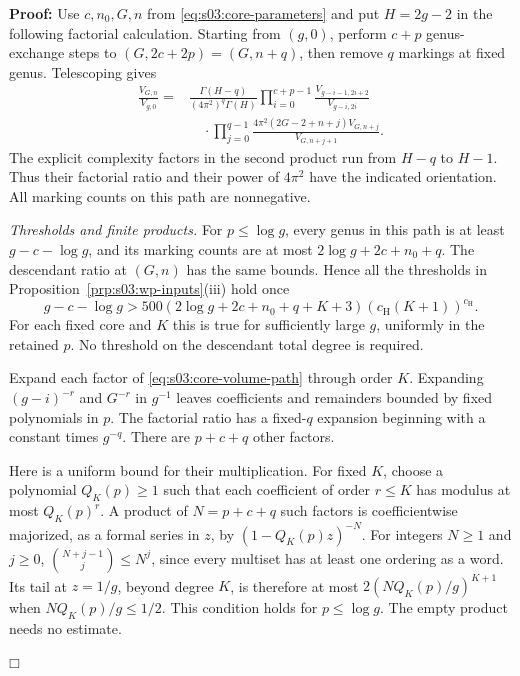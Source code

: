 \documentclass[a4paper,10pt]{article}
\numberwithin{equation}{section}
\theoremstyle{paperplain}
\theoremstyle{paperremark}
\theoremstyle{paperplain}
\newenvironment{prf}{\noindent \textbf{Proof: }}{\hfill $\mdlgwhtsquare$\par\addvspace{0.5\baselineskip}}
\begin{document}
\begin{prf}
Use $c,n_0,G,n$ from \eqref{eq:s03:core-parameters} and put
$H=2g-2$ in the following factorial calculation.
Starting from $(g,0)$, perform $c+p$ genus-exchange steps to
$(G,2c+2p)=(G,n+q)$, then remove $q$ markings at fixed genus.
Telescoping gives
\begin{equation}
\label{eq:s03:core-volume-path}
\begin{split}
\frac{V_{G,n}}{V_{g,0}}
={}&\frac{\Gamma(H-q)}{(4\pi^2)^q\Gamma(H)}
 \prod_{i=0}^{c+p-1}\frac{V_{g-i-1,2i+2}}{V_{g-i,2i}}\\
&\quad\cdot\prod_{j=0}^{q-1}
 \frac{4\pi^2(2G-2+n+j)V_{G,n+j}}{V_{G,n+j+1}}.
\end{split}
\end{equation}
The explicit complexity factors in the second product run from
$H-q$ to $H-1$. Thus their factorial ratio and their power of
$4\pi^2$ have the indicated orientation. All marking counts
on this path are nonnegative.

\smallskip\noindent
\emph{Thresholds and finite products.}
For $p\leq\log g$, every genus in this path is at least
$g-c-\log g$, and its marking counts are at most
$2\log g+2c+n_0+q$. The descendant ratio at $(G,n)$ has the same
bounds. Hence all the thresholds in
Proposition~\ref{prp:s03:wp-inputs}\textup{(iii)} hold once
\[
g-c-\log g>
500(2\log g+2c+n_0+q+K+3)
       (c_{\mathrm H}(K+1))^{c_{\mathrm H}}.
\]
For each fixed core and $K$ this is true for sufficiently large $g$,
uniformly in the retained $p$. No threshold on the descendant
total degree is required.

Expand each factor of \eqref{eq:s03:core-volume-path} through
order $K$. Expanding $(g-i)^{-r}$ and $G^{-r}$ in $g^{-1}$ leaves
coefficients and remainders bounded by fixed polynomials in $p$.
The factorial ratio has a fixed-$q$ expansion beginning with a
constant times $g^{-q}$. There are $p+c+q$ other factors.

Here is a uniform bound for their multiplication. For fixed $K$,
choose a polynomial $Q_K(p)\geq1$ such that each coefficient of
order $r\leq K$ has modulus at most $Q_K(p)^r$.
A product of $N=p+c+q$ such factors is coefficientwise majorized,
as a formal series in $z$, by $(1-Q_K(p)z)^{-N}$. For integers
$N\geq1$ and $j\geq0$,
$\binom{N+j-1}{j}\leq N^j$, since every multiset has at least one
ordering as a word. Its tail at $z=1/g$, beyond degree $K$, is
therefore at most $2(NQ_K(p)/g)^{K+1}$ when
$NQ_K(p)/g\leq1/2$. This condition holds for $p\leq\log g$.
The empty product needs no estimate.


\end{prf}
\end{document}
